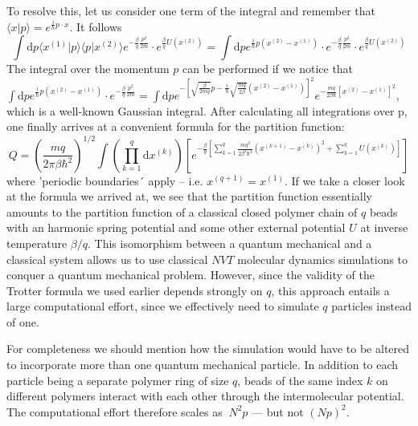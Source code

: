 To resolve this, let us consider one term of the integral and remember that $\langle x | p \rangle = e^{\frac{i}{\hbar}p\cdot x}$. It follows 
\begin{equation}
\int \text{d}p \langle x^{(1)} | p \rangle \langle p | x^{(2)}\rangle e^{-\frac{\beta}{q} \frac{p^2}{2m}} \cdot e^{\frac{\beta}{q}U(x^{(2)})} = \int \text{d}p e^{\frac{i}{\hbar}p(x^{(2)}-x^{(1)})} \cdot e^{-\frac{\beta}{q} \frac{p^2}{2m}} \cdot e^{\frac{\beta}{q}U(x^{(2)})}
\end{equation}
The integral over the momentum $p$ can be performed if we notice that $\int \text{d}p e^{\frac{i}{\hbar}p(x^{(2)}-x^{(1)})} \cdot e^{-\frac{\beta}{q} \frac{p^2}{2m}} = \int \text{d}p  e^{-\left[\sqrt{\frac{\beta}{2mq}}p-\frac{i}{\hbar}\sqrt{\frac{mq}{2\beta}}\left(x^{(2)}-x^{(1)}\right)\right]^2}e^{-\frac{mq}{2\beta\hbar}\left[x^{(2)}-x^{(1)}\right]^2}$, which is a well-known Gaussian integral. After calculating all integrations over p, one finally arrives at a convenient formula for the partition function: 
\begin{equation}
Q = \left(\frac{mq}{2\pi\beta\hbar^2}\right)^{1/2} \int \left(\prod_{k=1}^{q} \text{d}x^{(k)}\right) \left[ e^{-\frac{\beta}{q}\left[\sum_{k=1}^{q} \frac{mq^2}{2\beta^2\hbar^2}(x^{(k+1)}-x^{(k)})^2 + \sum_{k=1}^{q} U(x^{(k)})\right]}\right]
\end{equation}
where 'periodic boundaries´ apply -- i.e. $x^{(q+1)} = x^{(1)}$. If we take a closer look at the formula we arrived at, we see that the partition function essentially amounts to the partition function of a classical closed polymer chain of $q$ beads with an harmonic spring potential and some other external potential $U$ at inverse temperature $\beta/q$. This isomorphism between a quantum mechanical and a classical system allows us to use classical $NVT$ molecular dynamics simulations to conquer a quantum mechanical problem. However, since the validity of the Trotter formula we used earlier depends strongly on $q$, this approach entails a large computational effort, since we effectively need to simulate $q$ particles instead of one. 

For completeness we should mention how the simulation would have to be altered to incorporate more than one quantum mechanical particle. In addition to each particle being a separate polymer ring of size $q$, beads of the same index $k$ on different polymers interact with each other through the intermolecular potential. The computational effort therefore scales as $~N^2p$ --- but not $(Np)^2$.
